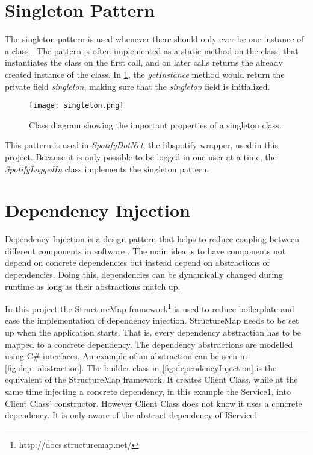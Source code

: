 \section{Singleton Pattern}

The singleton pattern is used whenever there should only ever be one
instance of a class \cite{skeet2013c}. The pattern is often implemented as a static
method on the class, that instantiates the class on the first call,
and on later calls returns the already created instance of the class. In
\cref{fig:singleton}, the \textit{getInstance} method would return the private field
\textit{singleton}, making sure that the \textit{singleton} field is initialized.

\begin{figure}[hbtp]
  \centering
  \texttt{[image: singleton.png]}
  \caption{Class diagram showing the important properties of a
    singleton class.}\label{fig:singleton}
\end{figure}

This pattern is used in \textit{SpotifyDotNet}, the libspotify wrapper, used in
this project. Because it is only possible to be logged in one user at
a time, the \textit{SpotifyLoggedIn} class implements the singleton pattern.

\section{Dependency Injection}

Dependency Injection is a design pattern that helps to reduce coupling
between different components in software \cite{injection}. The main idea is
to have components not depend on concrete dependencies but instead
depend on abstractions of dependencies. Doing this, dependencies can
be dynamically changed during runtime as long as their abstractions
match up.

In this project the StructureMap framework\footnote{http://docs.structuremap.net/} is used to reduce
boilerplate and ease the implementation of dependency
injection. StructureMap needs to be set up when the application
starts. That is, every dependency abstraction has to be mapped to a
concrete dependency. The dependency abstractions are modelled using
C\# interfaces. An example of an abstraction can be seen in
\cref{fig:dep_abstraction}. The
builder class in \cref{fig:dependencyInjection} is the equivalent of the StructureMap
framework. It creates Client Class, while at the same time injecting a
concrete dependency, in this example the Service1, into Client Class' constructor. However Client
Class does not know it uses a concrete dependency. It is only aware of
the abstract dependency of IService1.

